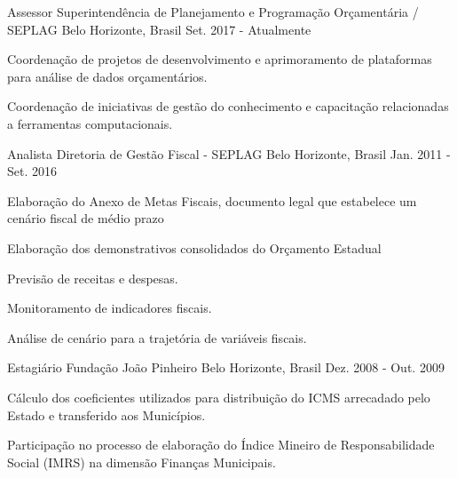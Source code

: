 \begin{cventries}
    \cventry
    {Assessor}
    {Superintendência de Planejamento e Programação Orçamentária / SEPLAG}
    {Belo Horizonte, Brasil}
    {Set. 2017 - Atualmente}
    {
      \begin{cvitems}
        \item {Coordenação de projetos de desenvolvimento e aprimoramento de plataformas para análise de dados orçamentários.}
        \item {Coordenação de iniciativas de gestão do conhecimento e capacitação relacionadas a ferramentas computacionais.}
      \end{cvitems}
    }
    \cventry
    {Analista}
    {Diretoria de Gestão Fiscal - SEPLAG}
    {Belo Horizonte, Brasil}
    {Jan. 2011 - Set. 2016}
    {
      \begin{cvitems}
        \item {Elaboração do Anexo de Metas Fiscais, documento legal que estabelece um cenário fiscal de médio prazo}
        \item {Elaboração dos demonstrativos consolidados do Orçamento Estadual}
        \item {Previsão de receitas e despesas.}
        \item {Monitoramento de indicadores fiscais.}
        \item {Análise de cenário para a trajetória de variáveis fiscais.}
      \end{cvitems}
    }
    \cventry
    {Estagiário}
    {Fundação João Pinheiro}
    {Belo Horizonte, Brasil}
    {Dez. 2008 - Out. 2009}
    {
      \begin{cvitems}
        \item {Cálculo dos coeficientes utilizados para distribuição do ICMS arrecadado pelo Estado e transferido aos Municípios.}
        \item {Participação no processo de elaboração do Índice Mineiro de Responsabilidade Social (IMRS) na dimensão Finanças Municipais.}
      \end{cvitems}
    }  
\end{cventries}
